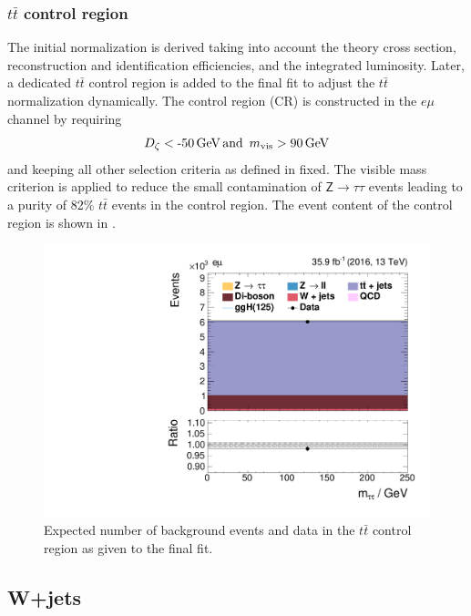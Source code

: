 \subsubsection{$t\bar{t}$ control region}

The initial normalization is derived taking into account the theory cross section, reconstruction and identification efficiencies, and the integrated luminosity. Later, a dedicated
$t\bar{t}$ control region is added to the final fit to adjust the $t\bar{t}$ normalization dynamically. The control region (CR) is 
constructed in the $e\mu$ channel by requiring 
\begin{equation}
    D_\zeta < \text{-50\,{GeV}} \text{\,and \,} m_\text{vis} > \text{90\,GeV} 
\end{equation}
and keeping all other selection criteria as defined in  fixed.
The visible mass criterion is applied to reduce the small contamination of $\mathsf{Z\rightarrow\tau\tau}$ events leading to a purity of 82\% $t\bar{t}$ events in the control region.
The event content of the control region is shown in . 

\begin{figure}[h!]
    \centering
    \includegraphics[width=.5\textwidth]{Figures/background_estimation/ttbar/m_sv.pdf}
    \caption[$t\bar{t}$ control region.]{Expected number of background events and data in the $t\bar{t}$ control region as given to the final fit.}\label{bkg:ttbar:control_region}
\end{figure}%

\subsection{W+jets}\label{sec:BackgroundEstimations:W}

